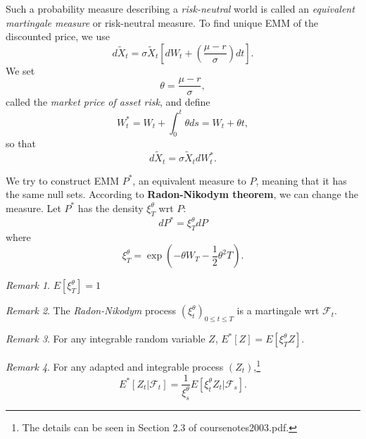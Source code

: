 \documentclass[a4paper,12pt]{article}
\numberwithin{equation}{section}
\theoremstyle{definition}
\theoremstyle{remark}
\newtheorem{remark}{Remark}[section]
\begin{document}
Such a probability measure describing a \textit{risk-neutral} world 
is called an \textit{equivalent martingale measure} or risk-neutral 
measure. To find unique EMM of the discounted price, we use 
\begin{equation}
    d\widetilde{X}_{t}=\sigma\widetilde{X}_{t}
    \left[dW_{t}+\left(\frac{\mu-r}{\sigma}\right)dt\right].
\end{equation}
We set 
\begin{equation}
    \theta = \frac{\mu-r}{\sigma},
\end{equation}
called the \textit{market price of asset risk}, and define 
\begin{equation}
\label{eq:risk_neutral_BM}
    W_{t}^{*}=W_{t}+\int_{0}^{t} \theta ds = W_{t}+\theta t,
\end{equation}
so that 
\begin{equation}
\label{eq:EMM}
    d\widetilde{X}_{t}=\sigma\widetilde{X}_{t}dW_{t}^{*}.
\end{equation}

We try to construct EMM $P^{*}$, an equivalent measure to $P$, 
meaning that it has the same null sets. According to 
\textbf{Radon-Nikodym theorem}, we can change the measure. Let 
$P^{*}$ has the density $\xi_{T}^{\theta}$ wrt $P$: 
\begin{equation}
    dP^{*}=\xi_{T}^{\theta}dP
\end{equation}
where 
\begin{equation}
    \xi_{T}^{\theta}=\exp(-\theta W_{T}-\frac{1}{2}\theta^{2}T).
\end{equation}

\begin{remark}
$E[\xi_{T}^{\theta}]=1$
\end{remark}

\begin{remark}\label{Radon_Nikodym}
The \textit{Radon-Nikodym} process $(\xi_{t}^{\theta})_{0\leq t\leq T}$ 
is a martingale wrt $\mathcal{F}_t$.
\end{remark}

\begin{remark}
For any integrable random variable $Z$, 
$E^{*}[Z]=E[\xi_{T}^{\theta}Z]$.
\end{remark}

\begin{remark}
For any adapted and integrable process $(Z_t)$,\footnote{The details 
can be seen in Section 2.3 of coursenotes2003.pdf.}
\begin{equation}\label{eq:EMM_expectation}
    E^{*}[Z_{t}|\mathcal{F}_{t}]
    =\frac{1}{\xi_{s}^{\theta}}E[\xi_{t}^{\theta}Z_{t}|\mathcal{F}_s].
\end{equation}
\end{remark}
\end{document}
